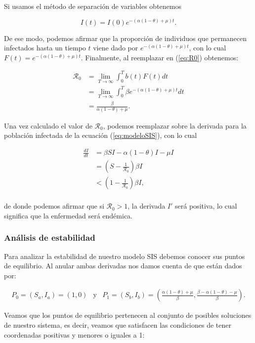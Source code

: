 Si usamos el método de separación de variables obtenemos

\begin{equation}\label{eq:Infectados en el tiempo}
I(t) = I(0)e^{-(\alpha(1-\theta)+\mu)t}.
\end{equation}

De ese modo, podemos afirmar que la proporción de individuos que permanecen infectados hasta un tiempo $t$ viene dado por $e^{-(\alpha(1-\theta)+\mu)t}$, con lo cual $F(t)=e^{-(\alpha(1-\theta)+\mu)t}$. Finalmente, al reemplazar en (\ref{eq:R0}) obtenemos:

\begin{align*}
\mathcal{R}_0 &= \lim_{T\to\infty}\int_0^T b(t)F(t) dt \\
&= \lim_{T\to\infty}\int_0^T \beta e^{-(\alpha(1-\theta)+\mu)t} dt\\
&= \frac{\beta}{\alpha(1-\theta)+\mu}.
\end{align*}

Una vez calculado el valor de $\mathcal{R}_0$, podemos reemplazar sobre la derivada para la población infectada de la ecuación (\ref{eq:modeloSIS}), con lo cual

\begin{align*}
    \frac{dI}{dt} &= \beta SI - \alpha(1-\theta)I - \mu I \\
    &= \left(S-\frac{1}{\mathcal{R}_0}\right)\beta I \\
    &< \left(1-\frac{1}{\mathcal{R}_0}\right)\beta I, \\
\end{align*}

de donde podemos afirmar que si $\mathcal{R}_0>1$, la derivada $I'$ será positiva, lo cual significa que la enfermedad será endémica.

\subsubsection{Análisis de estabilidad}

Para analizar la estabilidad de nuestro modelo SIS debemos conocer sus puntos de equilibrio. Al anular ambas derivadas nos damos cuenta de que están dados por:

$$\begin{array}{ccc}
    P_0=(S_a,I_a)=(1,0) & \text{y} & P_1=(S_b,I_b)=\left(\frac{\alpha(1-\theta)+\mu}{\beta},\frac{\beta-\alpha(1-\theta)-\mu}{\beta}\right).
\end{array}$$

Veamos que los puntos de equilibrio pertenecen al conjunto de posibles soluciones de nuestro sistema, es decir, veamos que satisfacen las condiciones de tener coordenadas positivas y menores o iguales a 1:

